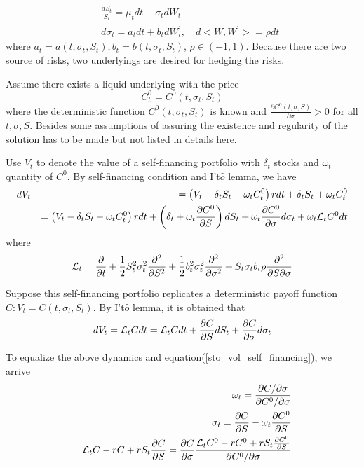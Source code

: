 \documentclass[10pt]{article}
\theoremstyle{plain}
\numberwithin{equation}{section}
\numberwithin{table}{section}
\newcommand{\s}{\sigma}
\newcommand{\om}{\omega}
\newcommand{\prt}[1]{\left( #1 \right)}  %
\newcommand{\de}{\delta}
\newcommand{\pa}{\partial}
\begin{document}
\begin{eqnarray*}
    &&\frac{d S_t}{S_t} = \mu_t dt + \s_t dW_t   \\
    &&d \s_t = a_t dt + b_t d W^{'}_t, \quad d<W, W^{'}>=\rho dt
\end{eqnarray*}
where $a_t=a(t, \s_t, S_t), b_t=b(t, \s_t, S_t)$, $\rho \in (-1, 1)$. Because there are two source of risks, two underlyings are desired for hedging the risks. 

Assume there exists a liquid underlying with the price
\[
    C_t^0=C^0(t, \s_t, S_t)    
\]
where the deterministic function $C^0(t, \s_t, S_t)$ is known and $\frac{\pa C^0(t, \s, S)}{\pa \s} > 0$ for all $t,\s, S$. Besides some assumptions of assuring the
existence and regularity of the solution has to be made but not listed in details here.

Use $V_t$ to denote the value of a self-financing portfolio with $\de_t$ stocks and $\om_t$ quantity of $C^0$. By self-financing condition and I't$\hat{o}$ lemma, we have
\begin{eqnarray}
    dV_t &&= \prt{V_t - \de_tS_t - \om_tC^0_t} rdt + \de_tS_t + \om_tC^0_t \nonumber \\
    && =  \prt{V_t - \de_tS_t - \om_tC^0_t} rdt + \prt{\de_t + \om_t \frac{\pa C^0}{\pa S}}dS_t + \om_t \frac{\pa C^0}{\pa \s} d\s_t + \om_t {\cal{L}}_t C^0 dt
    \label{sto_vol_self_financing}
\end{eqnarray}
where 
\[
    {\cal{L}}_t = \frac{\pa}{\pa t} + \frac{1}{2} S_t^2 \s_t^2 \frac{\pa^2}{\pa S^2} + \frac{1}{2} b_t^2 \s_t^2 \frac{\pa^2}{\pa \s^2} + S_t\s_t b_t\rho \frac{\pa^2}{\pa S \pa \s}
\]

Suppose this self-financing portfolio replicates a deterministic payoff function $C: V_t =C(t, \s_t, S_t)$. By I't$\hat{o}$ lemma, it is obtained that
\[
    dV_t = {\cal{L}}_tC dt = {\cal{L}}_t C dt + \frac{\pa C}{ \pa S}dS_t + \frac{\pa C}{ \pa \s}d\s_t 
\]

To equalize the above dynamics and equation(\ref{sto_vol_self_financing}), we arrive 
\begin{eqnarray*}
    && \om_t = \frac{\pa C / \pa \s}{\pa C^0 / \pa \s}   \\
    && \s_t = \frac{\pa C}{\pa S} - \om_t \frac{\pa C^0}{\pa S}\\
    && {\cal{L}}_tC - rC + rS_t \frac{\pa C}{\pa S} = \frac{\pa C}{\pa \s}  \frac{{\cal{L}}_t C^0 - rC^0 + rS_t \frac{\pa C^0}{\pa S}}{\pa C^0 / \pa \s}
\end{eqnarray*}
\end{document}
